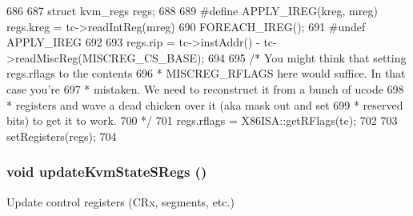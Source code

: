 \begin{DoxyCode}
686 {
687     struct kvm_regs regs;
688 
689 #define APPLY_IREG(kreg, mreg) regs.kreg = tc->readIntReg(mreg)
690     FOREACH_IREG();
691 #undef APPLY_IREG
692 
693     regs.rip = tc->instAddr() - tc->readMiscReg(MISCREG_CS_BASE);
694 
695     /* You might think that setting regs.rflags to the contents
696      * MISCREG_RFLAGS here would suffice. In that case you're
697      * mistaken. We need to reconstruct it from a bunch of ucode
698      * registers and wave a dead chicken over it (aka mask out and set
699      * reserved bits) to get it to work.
700      */
701     regs.rflags = X86ISA::getRFlags(tc);
702 
703     setRegisters(regs);
704 }
\end{DoxyCode}
\hypertarget{classX86KvmCPU_af58754cb34827756e0e0fc8474c54a8e}{
\subsubsection[{updateKvmStateSRegs}]{\setlength{\rightskip}{0pt plus 5cm}void updateKvmStateSRegs ()}}
\label{classX86KvmCPU_af58754cb34827756e0e0fc8474c54a8e}
Update control registers (CRx, segments, etc.) 



